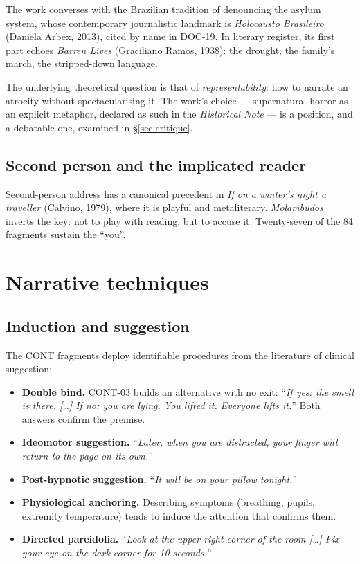 \documentclass[11pt,a4paper]{article}
\begin{document}
The work converses with the Brazilian tradition of denouncing the asylum
system, whose contemporary journalistic landmark is \textit{Holocausto
Brasileiro} (Daniela Arbex, 2013), cited by name in DOC-19. In literary
register, its first part echoes \textit{Barren Lives} (Graciliano Ramos,
1938): the drought, the family's march, the stripped-down language.

The underlying theoretical question is that of \textit{representability}: how
to narrate an atrocity without spectacularising it. The work's choice ---
supernatural horror as an explicit metaphor, declared as such in the
\textit{Historical Note} --- is a position, and a debatable one, examined in
\S\ref{sec:critique}.

\subsection{Second person and the implicated reader}

Second-person address has a canonical precedent in \textit{If on a winter's
night a traveller} (Calvino, 1979), where it is playful and metaliterary.
\textit{Molambudos} inverts the key: not to play with reading, but to accuse
it. Twenty-seven of the 84 fragments sustain the ``you''.

\section{Narrative techniques}

\subsection{Induction and suggestion}

The CONT fragments deploy identifiable procedures from the literature of
clinical suggestion:

\begin{itemize}
\item \textbf{Double bind.} CONT-03 builds an alternative with no exit:
``\textit{If yes: the smell is there. [\ldots] If no: you are lying. You
lifted it. Everyone lifts it.}'' Both answers confirm the premise.

\item \textbf{Ideomotor suggestion.} ``\textit{Later, when you are distracted,
your finger will return to the page on its own.}''

\item \textbf{Post-hypnotic suggestion.} ``\textit{It will be on your pillow
tonight.}''

\item \textbf{Physiological anchoring.} Describing symptoms (breathing,
pupils, extremity temperature) tends to induce the attention that confirms them.

\item \textbf{Directed pareidolia.} ``\textit{Look at the upper right corner of
the room [\ldots] Fix your eye on the dark corner for 10 seconds.}''
\end{itemize}
\end{document}
